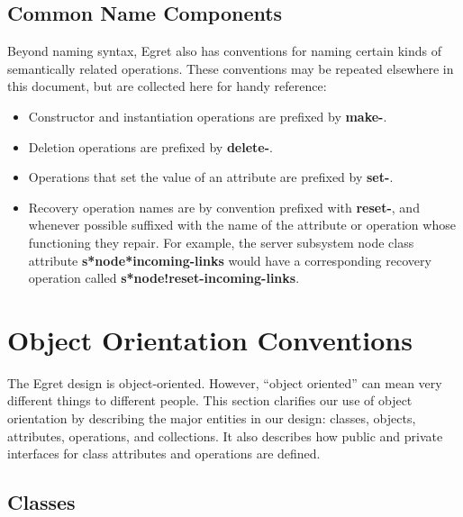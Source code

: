 \subsection{Common Name Components}

Beyond naming syntax, Egret also has conventions for naming certain
kinds of semantically related operations.  These conventions may be
repeated elsewhere in this document, but are collected here for
handy reference:

\begin{itemize}

\item Constructor and instantiation operations are prefixed by {\bf make-}.

\item Deletion operations are prefixed by {\bf delete-}.

\item Operations that set the value of an attribute are prefixed by {\bf set-}.

\item Recovery operation names are by convention prefixed with {\bf reset-},
and whenever possible suffixed with the name of the attribute or
operation whose functioning they repair.  For example, the server
subsystem node class attribute {\bf s*node*incoming-links}
would have a corresponding recovery operation called {\bf s*node!reset-incoming-links}.

\end{itemize}

\section{Object Orientation Conventions}

The Egret design is object-oriented.  However, ``object oriented'' can
mean very different things to different people.  This section
clarifies our use of object orientation by describing the major
entities in our design: classes, objects, attributes, operations, and
collections.  It also describes how public and private interfaces for
class attributes and operations are defined.


\subsection{Classes}  

